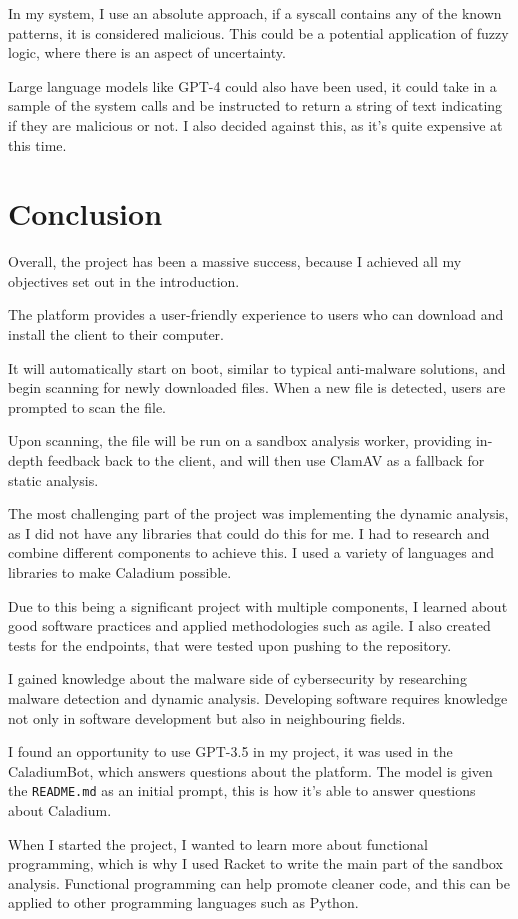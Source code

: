 In my system, I use an absolute approach, 
if a syscall contains any of the known patterns,
it is considered malicious.
This could be a potential application of fuzzy logic,
where there is an aspect of uncertainty.

Large language models like GPT-4 could also have been used,
it could take in a sample of the system calls and
be instructed to return a string of text
indicating if they are malicious or not.
I also decided against this, as it's quite expensive at this time.

\section{Conclusion}
Overall, the project has been a massive success,
because I achieved all my objectives set out in the introduction.

The platform provides a user-friendly experience to
users who can download and install the client to their computer.

It will automatically start on boot, similar to typical anti-malware solutions,
and begin scanning for newly downloaded files.
When a new file is detected, users are prompted to scan the file.

Upon scanning, the file will be run on a sandbox analysis worker,
providing in-depth feedback back to the client,
and will then use ClamAV as a fallback for static analysis.

The most challenging part of the project was implementing the dynamic analysis,
as I did not have any libraries that could do this for me.
I had to research and combine different components to achieve this.
I used a variety of languages and libraries to make Caladium possible.

Due to this being a significant project with multiple components,
I learned about good software practices and applied methodologies such as agile.
I also created tests for the endpoints, that were tested upon pushing to the repository.

I gained knowledge about the malware side
of cybersecurity by researching malware detection
and dynamic analysis. \cite{10.1145/3329786}
Developing software requires knowledge not only
in software development but also in neighbouring fields.

I found an opportunity to use GPT-3.5 in my project,
it was used in the CaladiumBot, which answers questions about the platform.
The model is given the \texttt{README.md} as an initial prompt,
this is how it's able to answer questions about Caladium.

When I started the project, I wanted to learn more about functional programming,
which is why I used Racket to write the main part of the sandbox analysis.
Functional programming can help promote cleaner code,
and this can be applied to other programming languages such as Python.
